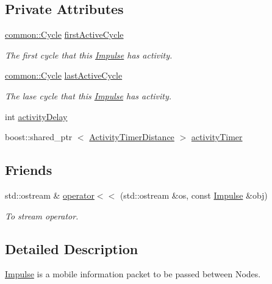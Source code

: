\subsection*{\-Private \-Attributes}
\begin{DoxyCompactItemize}
\item 
\hyperlink{classcryomesh_1_1common_1_1Cycle}{common\-::\-Cycle} \hyperlink{classcryomesh_1_1components_1_1Impulse_a1e60e9449535dde78c2a342b873022f7}{first\-Active\-Cycle}
\begin{DoxyCompactList}\small\item\em \-The first cycle that this \hyperlink{classcryomesh_1_1components_1_1Impulse}{\-Impulse} has activity. \end{DoxyCompactList}\item 
\hyperlink{classcryomesh_1_1common_1_1Cycle}{common\-::\-Cycle} \hyperlink{classcryomesh_1_1components_1_1Impulse_adc17d78b2127229c3acdaefb7b697f7e}{last\-Active\-Cycle}
\begin{DoxyCompactList}\small\item\em \-The lase cycle that this \hyperlink{classcryomesh_1_1components_1_1Impulse}{\-Impulse} has activity. \end{DoxyCompactList}\item 
int \hyperlink{classcryomesh_1_1components_1_1Impulse_ae491ccf924dc04674fb604a5258e0580}{activity\-Delay}
\item 
boost\-::shared\-\_\-ptr\*
$<$ \hyperlink{classcryomesh_1_1components_1_1ActivityTimerDistance}{\-Activity\-Timer\-Distance} $>$ \hyperlink{classcryomesh_1_1components_1_1Impulse_a6fc33296a0683cc08c5ea7404632a793}{activity\-Timer}
\end{DoxyCompactItemize}
\subsection*{\-Friends}
\begin{DoxyCompactItemize}
\item 
std\-::ostream \& \hyperlink{classcryomesh_1_1components_1_1Impulse_ab7b2621039dab2cd363725afdf5d667a}{operator$<$$<$} (std\-::ostream \&os, const \hyperlink{classcryomesh_1_1components_1_1Impulse}{\-Impulse} \&obj)
\begin{DoxyCompactList}\small\item\em \-To stream operator. \end{DoxyCompactList}\end{DoxyCompactItemize}


\subsection{\-Detailed \-Description}
\hyperlink{classcryomesh_1_1components_1_1Impulse}{\-Impulse} is a mobile information packet to be passed between \-Nodes. 

